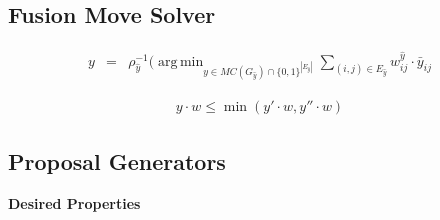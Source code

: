 \documentclass[10pt,twocolumn,letterpaper]{article}
\DeclareMathOperator*{\argmin}{arg\,min}
\begin{document}






\subsection{Fusion Move Solver}




\begin{center}
    \begin{eqnarray}
        y 
        &=& 
        \rho_{\hat{y}}^{-1}(
        \argmin_{y \in MC(G_{\hat{y}})\cap \{0,1\}^{|E_{\hat{y}}|}} 
        \sum_{ (i,j) \in E_{\hat{y}} } 
        w^{\hat{y}}_{ij} \cdot \bar{y}_{ij} 
    \end{eqnarray}
\end{center}

\begin{center}
    \begin{eqnarray}
      y \cdot w \leq \min(y'\cdot w,  y'' \cdot w) 
    \end{eqnarray}
\end{center}


\subsection{Proposal Generators}

\textbf{Desired Properties}
\end{document}
